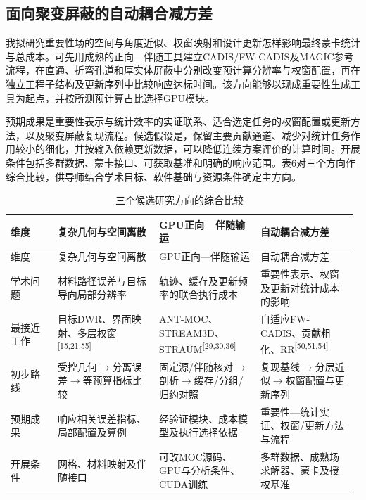 \documentclass[UTF8, zihao=-4, fontset=none, a4paper]{ctexart}
\newcommand{\upcite}[1]{\textsuperscript{[#1]}}
\begin{document}
\subsection{面向聚变屏蔽的自动耦合减方差}

我拟研究重要性场的空间与角度近似、权窗映射和设计更新怎样影响最终蒙卡统计与总成本。可先用成熟的正向---伴随工具建立CADIS/FW-CADIS及MAGIC参考流程，在直通、折弯孔道和厚实体屏蔽中分别改变预计算分辨率与权窗配置，再在独立工程子结构及更新序列中比较响应达标时间。该方向能够以现成重要性生成工具为起点，并按所测预计算占比选择GPU模块。

预期成果是重要性表示与统计效率的实证联系、适合选定任务的权窗配置或更新方法，以及聚变屏蔽复现流程。候选假设是，保留主要贡献通道、减少对统计任务作用较小的细化，并按输入依赖更新数据，可以降低连续方案评价的计算时间。开展条件包括多群数据、蒙卡接口、可获取基准和明确的响应范围。表6对三个方向作综合比较，供导师结合学术目标、软件基础与资源条件确定主方向。 \begin{longtable}{@{}>{\raggedright\arraybackslash}p{0.13\linewidth}>{\raggedright\arraybackslash}p{0.29\linewidth}>{\raggedright\arraybackslash}p{0.29\linewidth}>{\raggedright\arraybackslash}p{0.27\linewidth}@{}}
\caption{三个候选研究方向的综合比较}\label{tab:6}\\
\toprule
维度 & 复杂几何与空间离散 & GPU正向—伴随输运 & 自动耦合减方差 \\
\midrule
\endfirsthead
\toprule
维度 & 复杂几何与空间离散 & GPU正向—伴随输运 & 自动耦合减方差 \\
\midrule
\endhead
\bottomrule
\endlastfoot
学术问题 & 材料路径误差与目标导向局部分辨率 & 轨迹、缓存及更新频率的联合执行成本 & 重要性表示、权窗及更新对统计成本的影响 \\
最接近工作 & 目标DWR、界面映射、多层权窗\upcite{15,21,55} & ANT-MOC、STREAM3D、STRAUM\upcite{29,30,36} & 自适应FW-CADIS、贡献粗化、RR\upcite{50,51,54} \\
初步路线 & 受控几何$\rightarrow$分离误差$\rightarrow$等预算指标比较 & 固定源/伴随核对$\rightarrow$剖析$\rightarrow$缓存/分组/归约对照 & 复现基线$\rightarrow$分层近似$\rightarrow$权窗配置与更新序列 \\
预期成果 & 响应相关误差指标、局部配置及算例 & 经验证模块、成本模型及执行选择依据 & 重要性—统计实证、权窗/更新方法与流程 \\
开展条件 & 网格、材料映射及伴随接口 & 可改MOC源码、GPU与分析条件、CUDA训练 & 多群数据、成熟场求解器、蒙卡及授权基准 \\
\end{longtable}
\end{document}
